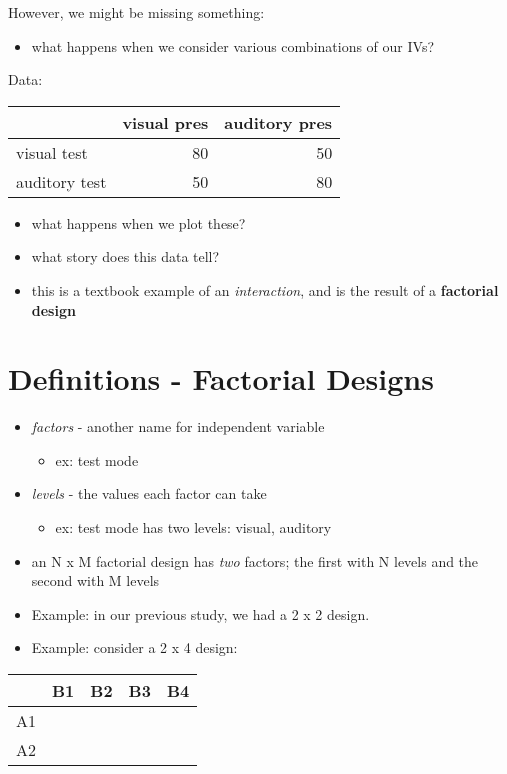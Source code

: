 \documentclass[11pt]{article}
\begin{document}
However, we might be missing something:
\begin{itemize}
\item what happens when we consider various combinations of our IVs?
\end{itemize}

Data:

\begin{center}
\begin{tabular}{lrr}
 & visual pres & auditory pres\\
\hline
visual test & 80 & 50\\
auditory test & 50 & 80\\
\end{tabular}
\end{center}

\begin{itemize}
\item what happens when we plot these?
\item what story does this data tell?
\item this is a textbook example of an \emph{interaction}, and is the result of a \textbf{factorial design}
\end{itemize}

\section*{Definitions - Factorial Designs}
\label{sec-2}
\begin{itemize}
\item \emph{factors} - another name for independent variable
\begin{itemize}
\item ex: test mode
\end{itemize}
\item \emph{levels} - the values each factor can take
\begin{itemize}
\item ex: test mode has two levels: visual, auditory
\end{itemize}
\item an N x M factorial design has \emph{two} factors; the first with N levels and the second with M levels
\item Example: in our previous study, we had a 2 x 2 design.
\item Example: consider a 2 x 4 design:
\end{itemize}

\begin{center}
\begin{tabular}{lllll}
 & B1 & B2 & B3 & B4\\
\hline
A1 &  &  &  & \\
A2 &  &  &  & \\
\end{tabular}
\end{center}
\end{document}
